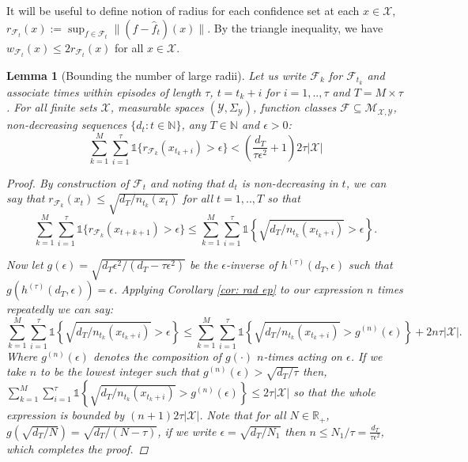 \documentclass{article}
\newtheorem{lemma}{Lemma}
\newcommand{\Real}{\mathds{R}}
\newcommand{\Nat}{\mathbb{N}}
\newcommand{\Ind}{\mathds{1}}
\newcommand{\Xc}{\mathcal{X}}
\newcommand{\Yc}{\mathcal{Y}}
\newcommand{\Fc}{\mathcal{F}}
\newcommand{\Mc}{\mathcal{M}}
\begin{document}
It will be useful to define notion of radius for each confidence set at each $x \in \Xc$,
$r_{\Fc_t}(x) := \sup_{f \in \Fc_t} \| (f - \hat{f}_t)(x) \|.$
By the triangle inequality, we have $w_{\Fc_t}(x) \le 2 r_{\Fc_t}(x)$ for all $x \in \Xc$.

\begin{lemma}[Bounding the number of large radii]
\label{lem: large rad} \hspace{0.000000001mm} \newline
Let us write $\Fc_k$ for $\Fc_{t_k}$ and associate times within episodes of length $\tau$, $t = t_k+i$ for $i=1,..,\tau$ and $T = M \times \tau$.
For all finite sets $\Xc$, measurable spaces $(\Yc,\Sigma_{\Yc})$, function classes $\Fc \subseteq \Mc_{\Xc,\Yc}$, non-decreasing sequences
$\{d_t : t \in \Nat \}$, any $T \in \Nat$ and $\epsilon >0$:
$$ \sum_{k=1}^M \sum_{i=1}^\tau \Ind\{r_{\Fc_k}(x_{t_k+i}) > \epsilon \} < \left( \frac{d_T}{\tau \epsilon^2} +1 \right) 2\tau | \Xc | $$

\begin{proof}
By construction of $\Fc_t$ and noting that $d_t$ is non-decreasing in $t$, we can say that $r_{\Fc_k}(x_t) \le \sqrt{d_T / n_{t_k}(x_t)} $ for all $ t = 1,..,T$ so that
$$ \sum_{k=1}^M \sum_{i=1}^\tau \Ind\{r_{\Fc_k}(x_{t+k+1}) > \epsilon \}
	 \le \sum_{k=1}^M \sum_{i=1}^\tau  \Ind \left\{ \sqrt{ d_T / n_{t_k}(x_{t_k+i}) } > \epsilon \right\}  .$$

Now let $g(\epsilon) = \sqrt{d_T \epsilon^2 / (d_T - \tau \epsilon^2)}$ be the $\epsilon$-inverse of $h^{(\tau)}(d_T,\epsilon)$ such that $g( h^{(\tau)}(d_T,\epsilon)) = \epsilon$.
Applying Corollary \ref{cor: rad ep} to our expression $n$ times repeatedly we can say:
$$\sum_{k=1}^M \sum_{i=1}^\tau  \Ind \left\{ \sqrt{ d_T / n_{t_k}(x_{t_k+i}) } > \epsilon \right\} \le
	\sum_{k=1}^M \sum_{i=1}^\tau  \Ind \left\{ \sqrt{ d_T / n_{t_k}(x_{t_k+i}) } > g^{(n)}(\epsilon) \right\} + 2n \tau |\Xc|.$$
Where $g^{(n)}(\epsilon)$ denotes the composition of $g(\cdot)$ $n$-times acting on $\epsilon$.
If we take $n$ to be the lowest integer such that $g^{(n)}(\epsilon) > \sqrt{d_T / \tau}$ then,
$\sum_{k=1}^M \sum_{i=1}^\tau  \Ind \left\{ \sqrt{ d_T / n_{t_k}(x_{t_k+i}) } > g^{(n)}(\epsilon) \right\} \le 2\tau |\Xc| $ so that the whole expression is bounded by $ \left( n + 1 \right) 2\tau | \Xc |$.
Note that for all $N \in \Real_+$, $g(\sqrt{d_T / N}) = \sqrt{d_T / (N-\tau)}$, if we write $\epsilon = \sqrt{d_T / N_1}$ then $n \le N_1 / \tau = \frac{d_T}{ \tau \epsilon^2}$, which completes the proof.

\end{proof}
\end{lemma}
\end{document}

